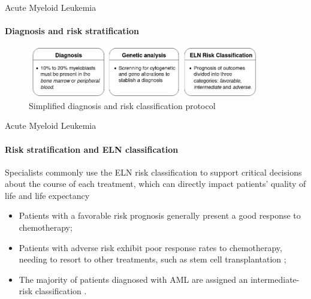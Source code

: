 \begin{frame}[fragile]{Acute Myeloid Leukemia}
\framesubtitle{Diagnosis and risk stratification}


\begin{center}
    
\begin{figure}
    \centering
    \includegraphics[width=0.9\textwidth]{beamerthemesrc/figs/ELN_classification_pipeline}
    \caption{Simplified diagnosis and risk classification protocol \cite{Dohner-2022}} %
    \label{fig:eln_guides}
\end{figure}
\end{center}
    

\end{frame}




\begin{frame}[fragile]{Acute Myeloid Leukemia}
\framesubtitle{Risk stratification and ELN classification}

Specialists commonly use the ELN risk classification to support critical decisions about the course of each treatment, which can directly impact patients' quality of life and life expectancy

\begin{itemize}
\item Patients with a favorable risk prognosis generally present a good response to chemotherapy;

\item Patients with adverse risk exhibit poor response rates to chemotherapy, needing to resort to other treatments, such as stem cell transplantation \cite{Genomic-2013}; 

\item The majority of patients diagnosed with AML are assigned an intermediate-risk classification \cite{Dohner-2010}.

\end{itemize}

\end{frame}



